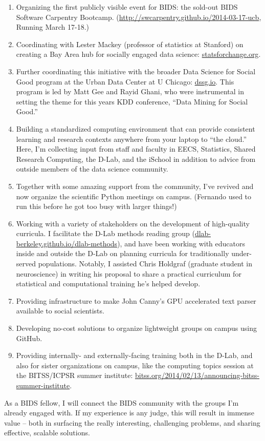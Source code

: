 \begin{enumerate}
    \item Organizing the first publicly visible event for BIDS: the sold-out
        BIDS Software Carpentry Bootcamp.
        (\url{http://swcarpentry.github.io/2014-03-17-ucb}, Running March 17-18.)
    \item Coordinating with Lester Mackey (professor of statistics at Stanford)
        on creating a Bay Area hub for socially engaged data science:
        \url{statsforchange.org}.
    \item Further coordinating this initiative with the broader Data Science for
        Social Good program at the Urban Data Center at U Chicago:
        \url{dssg.io}. This program is led by Matt Gee and Rayid Ghani, who were
        instrumental in setting the theme for this years KDD conference, “Data
        Mining for Social Good.”
    \item Building a standardized computing environment that can provide
        consistent learning and research contexts anywhere from your laptop to
        “the cloud.” Here, I'm collecting input from staff and faculty in EECS,
        Statistics, Shared Research Computing, the D-Lab, and the iSchool in
        addition to advice from outside members of the data science community.
    \item Together with some amazing support from the community, I've revived
        and now organize the scientific Python meetings on campus. (Fernando
        used to run this before he got too busy with larger things!)
    \item Working with a variety of stakeholders on the development of
        high-quality curricula. I facilitate the D-Lab methods reading group
        (\url{dlab-berkeley.github.io/dlab-methods}), and have been working with
        educators inside and outside the D-Lab on planning curricula for
        traditionally under-served populations. Notably, I assisted Chris
        Holdgraf (graduate student in neuroscience) in writing his proposal to
        share a practical curriculum for statistical and computational
        training he's helped develop.
    \item Providing infrastructure to make John Canny's GPU accelerated text
        parser available to social scientists.
    \item Developing no-cost solutions to organize lightweight groups on campus
        using GitHub.
    \item Providing internally- and externally-facing training both in the
        D-Lab, and also for sister organizations on campus, like the computing
        topics session at the BITSS/ICPSR summer institute:
        \url{bitss.org/2014/02/13/announcing-bitss-summer-institute}.
\end{enumerate}

As a BIDS fellow, I will connect the BIDS community  with the groups I'm already
engaged with. If my experience is any judge, this will result in immense value
-- both in surfacing the really interesting, challenging problems, and sharing
effective, scalable solutions.


